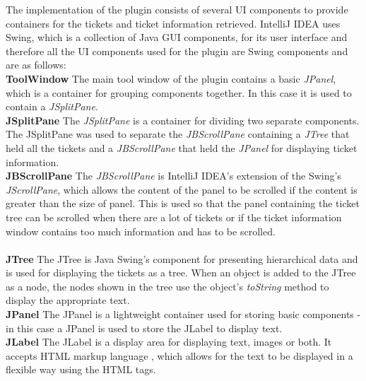 \documentclass{4thYearProject}
\begin{document}
The implementation of the plugin consists of several UI components to provide containers for the tickets and ticket information retrieved. IntelliJ IDEA uses Swing, which is a collection of Java GUI components, for its user interface and therefore all the UI components used for the plugin are Swing components and are as follows:\\ 
\newline
\textbf{ToolWindow}
\newline
The main tool window of the plugin contains a basic \textit{JPanel}, which is a container for grouping components together. In this case it is used to contain a \textit{JSplitPane}. \\
\newline
\textbf{JSplitPane}
\newline
The \textit{JSplitPane} is a container for dividing two separate components. The JSplitPane was used to separate the \textit{JBScrollPane} containing a \textit{JTree} that held all the tickets and a \textit{JBScrollPane} that held the \textit{JPanel} for displaying ticket information.
\newline\\
\textbf{JBScrollPane}
\newline
The \textit{JBScrollPane} is IntelliJ IDEA's extension of the Swing's \textit{JScrollPane}, which allows the content of the panel to be scrolled if the content is greater than the size of panel. This is used so that the panel containing the ticket tree can be scrolled when there are a lot of tickets or if the ticket information window contains too much information and has to be scrolled.\\
\newline
\\
\textbf{JTree}
\newline
The JTree is Java Swing's component for presenting hierarchical data and is used for displaying the tickets as a tree. When an object is added to the JTree as a node, the nodes shown in the tree use the object's \textit{toString} method to display the appropriate text.\\
\newline
\textbf{JPanel}
\newline
The JPanel is a lightweight container used for storing basic components - in this case a JPanel is used to store the JLabel to display text.  \\ 
\newline
\textbf{JLabel}
\newline
The JLabel is a display area for displaying text, images or both. It accepts HTML markup language , which allows for the text to be displayed in a flexible way using the HTML tags.\\ 
\end{document}
